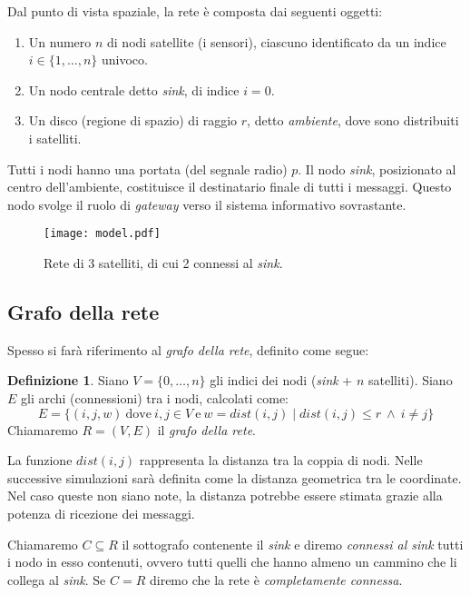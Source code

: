 \documentclass[a4paper,12pt]{article}
\theoremstyle{definition}
\newtheorem{definition}{Definizione}
\begin{document}
Dal punto di vista spaziale, la rete è composta dai seguenti oggetti:

\begin{enumerate}
\item Un numero $n$ di nodi satellite (i sensori), ciascuno identificato da un indice $i \in \{1, \dots, n\}$ univoco.
\item Un nodo centrale detto \emph{sink}, di indice $i = 0$.
\item Un disco (regione di spazio) di raggio $r$, detto \emph{ambiente}, dove sono distribuiti i satelliti.
\end{enumerate}

Tutti i nodi hanno una portata (del segnale radio) $p$. Il nodo \emph{sink}, posizionato al centro dell'ambiente, costituisce il destinatario finale di tutti i messaggi. Questo nodo svolge il ruolo di \emph{gateway} verso il sistema informativo sovrastante.

\begin{figure}[H]
\centering
\texttt{[image: model.pdf]}
\caption{Rete di 3 satelliti, di cui 2 connessi al \emph{sink}.}
\end{figure}

\subsection{Grafo della rete}

Spesso si farà riferimento al \emph{grafo della rete}, definito come segue:

\begin{definition}
Siano $V = \{0, \dots, n \}$ gli indici dei nodi (\emph{sink} + $n$ satelliti). Siano $E$ gli archi (connessioni) tra i nodi, calcolati come:
\begin{displaymath}
E = \{ (i, j, w) \ \text{dove} \ i, j \in V \ \text{e} \ w = dist(i, j) \mid dist(i, j) \le r \ \wedge \ i \neq j\}
\end{displaymath}
Chiamaremo $R = (V, E)$ il \emph{grafo della rete}.
\end{definition}

La funzione $dist(i, j)$ rappresenta la distanza tra la coppia di nodi. Nelle successive simulazioni sarà definita come la distanza geometrica tra le coordinate. Nel caso queste non siano note, la distanza potrebbe essere stimata grazie alla potenza di ricezione dei messaggi.

Chiamaremo $C \subseteq R$ il sottografo contenente il \emph{sink} e diremo \emph{connessi al sink} tutti i nodo in esso contenuti, ovvero tutti quelli che hanno almeno un cammino che li collega al \emph{sink}. Se $C = R$ diremo che la rete è \emph{completamente connessa}.
\end{document}
